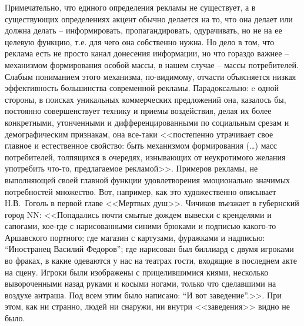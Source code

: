 Примечательно, что единого определения рекламы не существует, а в существующих
определениях акцент обычно делается на то, что она делает или должна делать --
информировать, пропагандировать, одурачивать, но не на ее целевую функцию, т.е.
для чего она собственно нужна. Но дело в том, что реклама есть не просто канал
донесения информации, но что гораздо важнее -- механизмом формирования особой массы,
в нашем случае -- массы потребителей. Слабым пониманием этого механизма, по-видимому,
отчасти объясняется низкая эффективность большинства современной рекламы.
Парадоксально: c одной стороны, в поисках уникальных коммерческих предложений
она, казалось бы, постоянно совершенствует технику и приемы воздействия,
делая их более конкретными, утонченными и дифференцированными по социальным
срезам и демографическим признакам, она все-таки <<постепенно утрачивает свое
главное и естественное свойство: быть механизмом формирования (\ldots) масс
потребителей, толпящихся в очередях, изнывающих от неукротимого желания
употребить что-то, предлагаемое рекламой>>\autocite[][312]{olshansky}. Примеров
рекламы, не выполняющей своей главной функции удовлетворения эмоционально
значимых потребностей множество. Вот, например, как это художественно описывает
Н.В.~Гоголь в первой главе <<Мертвых душ>>. Чичиков въезжает в губернский город NN:
<<Попадались почти смытые дождем вывески с кренделями и сапогами, кое-где с
нарисованными синими брюками и подписью какого-то Аршавского портного;
где магазин с картузами, фуражками и надписью: ``Иностранец Василий Федоров'';
где нарисован был биллиард с двумя игроками во фраках, в какие одеваются
у нас на театрах гости, входящие в последнем акте на сцену.
Игроки были изображены с прицелившимися киями, несколько вывороченными
назад руками и косыми ногами, только что сделавшими на воздухе антраша.
Под всем этим было написано: ``И вот заведение''.>>\autocite[][11--12]{gogol2006}.
При этом, как ни странно, людей ни снаружи, ни внутри <<заведения>> видно не было.

